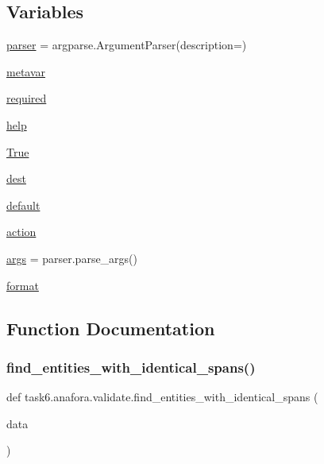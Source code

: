 \subsection*{Variables}
\begin{DoxyCompactItemize}
\item 
\hyperlink{namespacetask6_1_1anafora_1_1validate_a3447f48e5c837ed3695fa4abfa572f89}{parser} = argparse.\+Argument\+Parser(description=)
\item 
\hyperlink{namespacetask6_1_1anafora_1_1validate_a8bcdfdbd01b512444eff296eb5dc4464}{metavar}
\item 
\hyperlink{namespacetask6_1_1anafora_1_1validate_a581b517a43ab518ae5556c92558990b1}{required}
\item 
\hyperlink{namespacetask6_1_1anafora_1_1validate_a49e67e8d62f79664ce9f8baea63a79e9}{help}
\item 
\hyperlink{namespacetask6_1_1anafora_1_1validate_a418c197eeae0f84a35603719539583c5}{True}
\item 
\hyperlink{namespacetask6_1_1anafora_1_1validate_aea9aa849ad2df98babc9d15c4978e4b5}{dest}
\item 
\hyperlink{namespacetask6_1_1anafora_1_1validate_ac32fdb0d185a99ef24096abfa84ad579}{default}
\item 
\hyperlink{namespacetask6_1_1anafora_1_1validate_a13d39cf763ec9641e08cc89c1054e8ce}{action}
\item 
\hyperlink{namespacetask6_1_1anafora_1_1validate_abd8d766dc685fb0b059c93aff4237e2f}{args} = parser.\+parse\+\_\+args()
\item 
\hyperlink{namespacetask6_1_1anafora_1_1validate_a8073347f0a63de70012259797a4d5a2d}{format}
\end{DoxyCompactItemize}


\subsection{Function Documentation}
\mbox{\label{namespacetask6_1_1anafora_1_1validate_abf9a7c1cb1abdaf8fb17e797e3830d96}} 
\subsubsection{\texorpdfstring{find\+\_\+entities\+\_\+with\+\_\+identical\+\_\+spans()}{find\_entities\_with\_identical\_spans()}}
{\footnotesize\ttfamily def task6.\+anafora.\+validate.\+find\+\_\+entities\+\_\+with\+\_\+identical\+\_\+spans (\begin{DoxyParamCaption}\item[{}]{data }\end{DoxyParamCaption})}

